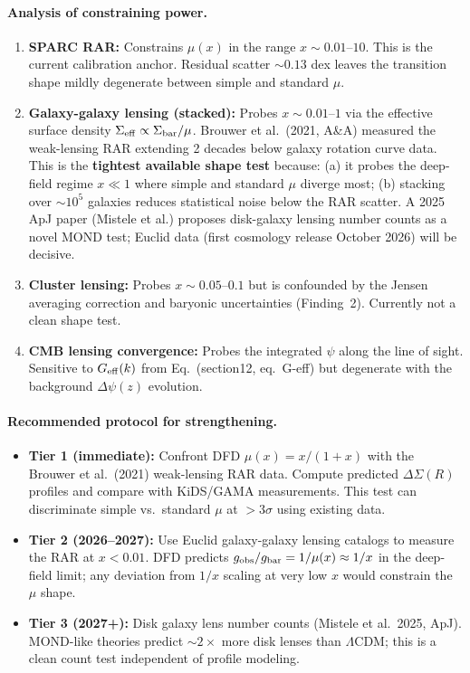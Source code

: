 \paragraph{Analysis of constraining power.}
\begin{enumerate}
\item \textbf{SPARC RAR:} Constrains $\mu(x)$ in the range $x \sim
  0.01$--$10$.  This is the current calibration anchor.  Residual
  scatter $\sim 0.13$ dex leaves the transition shape mildly
  degenerate between simple and standard $\mu$.
\item \textbf{Galaxy-galaxy lensing (stacked):}  Probes $x \sim
  0.01$--$1$ via the effective surface density $\Sigma_{\rm eff}
  \propto \Sigma_{\rm bar}/\mu$.  Brouwer et al.\ (2021, A\&A) measured
  the weak-lensing RAR extending 2 decades below galaxy rotation curve
  data.  This is the \textbf{tightest available shape test} because:
  (a) it probes the deep-field regime $x \ll 1$ where simple and
  standard $\mu$ diverge most; (b) stacking over $\sim 10^5$ galaxies
  reduces statistical noise below the RAR scatter.  A 2025 ApJ paper
  (Mistele et al.) proposes disk-galaxy lensing number counts as a
  novel MOND test; Euclid data (first cosmology release October 2026)
  will be decisive.
\item \textbf{Cluster lensing:} Probes $x \sim 0.05$--$0.1$ but is
  confounded by the Jensen averaging correction and baryonic
  uncertainties (Finding~2).  Currently not a clean shape test.
\item \textbf{CMB lensing convergence:} Probes the integrated $\psi$
  along the line of sight.  Sensitive to $G_{\rm eff}(k)$ from
  Eq.~(section12, eq.\ G-eff) but degenerate with the background
  $\Delta\psi(z)$ evolution.
\end{enumerate}

\paragraph{Recommended protocol for strengthening.}
\begin{itemize}
\item \textbf{Tier 1 (immediate):} Confront DFD $\mu(x) = x/(1+x)$
  with the Brouwer et al.\ (2021) weak-lensing RAR data.  Compute
  predicted $\Delta\Sigma(R)$ profiles and compare with KiDS/GAMA
  measurements.  This test can discriminate simple vs.\ standard $\mu$
  at $> 3\sigma$ using existing data.
\item \textbf{Tier 2 (2026--2027):} Use Euclid galaxy-galaxy lensing
  catalogs to measure the RAR at $x < 0.01$.  DFD predicts
  $g_{\rm obs}/g_{\rm bar} = 1/\mu(x) \approx 1/x$ in the deep-field
  limit; any deviation from $1/x$ scaling at very low $x$ would
  constrain the $\mu$ shape.
\item \textbf{Tier 3 (2027+):} Disk galaxy lens number counts
  (Mistele et al.\ 2025, ApJ).  MOND-like theories predict
  $\sim 2\times$ more disk lenses than $\Lambda$CDM; this is a
  clean count test independent of profile modeling.
\end{itemize}


